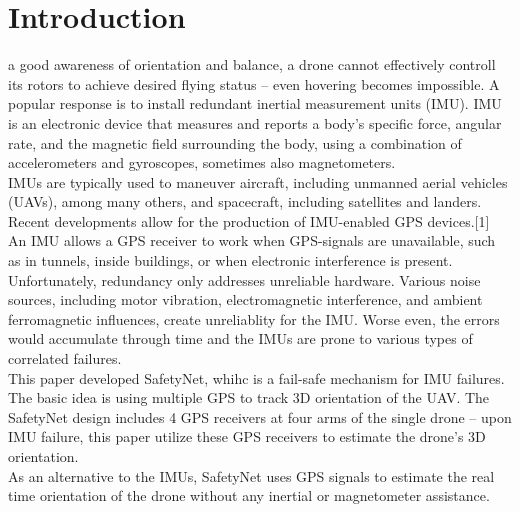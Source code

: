 \documentclass[journal,onecolumn]{IEEEtran}
\begin{document}
\section{Introduction}
%
%
%
%
 a good awareness of orientation and balance, a drone
cannot effectively controll its rotors to achieve desired flying status – even hovering becomes impossible.
A popular response is to install redundant inertial measurement units (IMU).
IMU is an electronic device that measures and reports a body's specific force,
angular rate, and the magnetic field surrounding the body, using a combination
of accelerometers and gyroscopes, sometimes also magnetometers.\\
IMUs are typically used to maneuver aircraft, including unmanned aerial vehicles
(UAVs), among many others, and spacecraft, including satellites and landers.
Recent developments allow for the production of IMU-enabled GPS devices.[1]\\
An IMU allows a GPS receiver to work when GPS-signals are unavailable,
such as in tunnels, inside buildings, or when electronic interference is present.
Unfortunately, redundancy only addresses unreliable hardware.
Various noise sources, including motor vibration, electromagnetic interference,
and ambient ferromagnetic influences, create unreliablity for the IMU. Worse even,
the errors would accumulate through time and the IMUs are prone to various types of
correlated failures.\\
This paper developed SafetyNet, whihc is a fail-safe mechanism for IMU failures. The basic idea is using
multiple GPS to track 3D orientation of the UAV. The SafetyNet design includes 4 GPS
receivers at four arms of the single drone – upon IMU failure, this paper utilize these
GPS receivers to estimate the drone’s 3D orientation.\\
As an alternative to the IMUs, SafetyNet uses GPS signals to estimate the real time
orientation of the drone without any inertial or magnetometer assistance.
\end{document}
